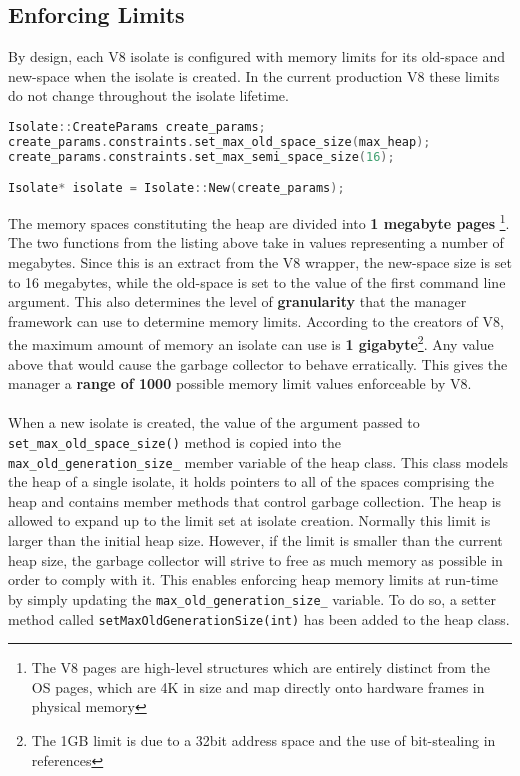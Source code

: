\documentclass{l4proj}
\begin{document}
\subsection{Enforcing Limits}
\hspace*{1em} By design, each V8 isolate is configured with memory limits for its old-space and new-space when the isolate is created. In the current production V8 these limits do not change throughout the isolate lifetime.
\begin{lstlisting}[language=cpp]
Isolate::CreateParams create_params;
create_params.constraints.set_max_old_space_size(max_heap);
create_params.constraints.set_max_semi_space_size(16);

Isolate* isolate = Isolate::New(create_params);
\end{lstlisting}
\hspace*{1em} The memory spaces constituting the heap are divided into \textbf{1 megabyte pages}
\footnote{The V8 pages are high-level structures which are 
entirely distinct from the OS pages, which are 4K in size and map directly onto hardware frames in physical memory}.
The two functions from the listing above take in values representing a number of megabytes. Since this is an extract from the V8 wrapper, the new-space size is set to 16 megabytes, while the old-space is set to the value of the first command line argument. This also determines the level of \textbf{granularity} that the manager framework can use to determine memory limits. According to the creators of V8, the maximum amount of memory an isolate can use is \textbf{1 gigabyte}\footnote{The 1GB limit is due to a 32bit address space and the use of bit-stealing in references}. Any value above that would cause the garbage collector to behave erratically\cite{v8sizebug}. This gives the manager a \textbf{range of 1000} possible memory limit values enforceable by V8.
\\\\
\hspace*{1em} When a new isolate is created, the value of the argument passed to \texttt{set\_max\_old\_space\_size()} method is copied into the \texttt{max\_old\_generation\_size\_} member variable of the heap class. This class models the heap of a single isolate, it holds pointers to all of the spaces comprising the heap and contains member methods that control garbage collection. The heap is allowed to expand up to the limit set at isolate creation. Normally this limit is larger than the initial heap size. However, if the limit is smaller than the current heap size, the garbage collector will strive to free as much memory as possible in order to comply with it. This enables enforcing heap memory limits at run-time by simply updating the  \texttt{max\_old\_generation\_size\_} variable. To do so, a setter method called \texttt{setMaxOldGenerationSize(int)} has been added to the heap class.
\end{document}

